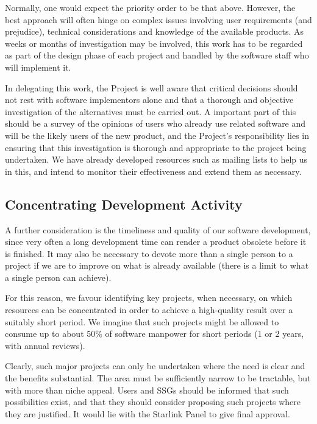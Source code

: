 Normally, one would expect the priority order to be that
above. However, the best approach will often hinge on complex issues
involving user requirements (and prejudice), technical considerations
and knowledge of the available products. As weeks or months of
investigation may be involved, this work has to be regarded as part
of the design phase of each project and handled by the software staff
who will implement it.

In delegating this work, the Project is well aware that critical
decisions should not rest with software implementors alone and that a
thorough and objective investigation of the alternatives must be
carried out.  A important part of this should be a survey of the
opinions of users who already use related software and will be the
likely users of the new product, and the Project's responsibility lies
in ensuring that this investigation is thorough and appropriate to the
project being undertaken. We have already developed resources such as
mailing lists to help us in this, and intend to monitor their
effectiveness and extend them as necessary.

\subsection{Concentrating Development Activity}

A further consideration is the timeliness and quality of our software
development, since very often a long development time can render a
product obsolete before it is finished. It may also be necessary to
devote more than a single person to a project if we are to improve on
what is already available (there is a limit to what a single person
can achieve).

For this reason, we favour identifying key projects, when necessary, on
which resources can be concentrated in order to achieve a high-quality
result over a suitably short period. We imagine that such projects
might be allowed to consume up to about 50\% of software manpower for
short periods (1 or 2 years, with annual reviews).

Clearly, such major projects can only be undertaken where the need is
clear and the benefits substantial.  The area must be sufficiently
narrow to be tractable, but with more than niche appeal.  Users and
SSGs should be informed that such possibilities exist, and that they
should consider proposing such projects where they are justified. It
would lie with the Starlink Panel to give final approval.

